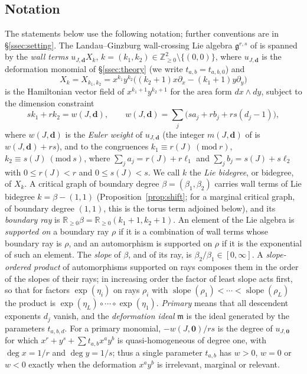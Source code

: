 \documentclass[11pt]{amsart}
\theoremstyle{definition}
\theoremstyle{remark}
\newcommand{\ZZ}{\mathbb{Z}}
\newcommand{\RR}{\mathbb{R}}
\newcommand{\gfrak}{\mathfrak{g}}
\begin{document}
\subsection*{Notation}
The statements below use the following notation; further conventions are in
\S\ref{ssec:setting}.  The Landau--Ginzburg wall-crossing Lie algebra
$\gfrak^{r,s}$ of \cite[Def.~4.23]{GKT} is spanned by the \emph{wall terms}
$u_{J,\mathbf d}X_{k}$, $k=(k_1,k_2)\in\ZZ^2_{\ge0}\setminus\{(0,0)\}$, where
$u_{J,\mathbf d}$ is the deformation monomial of \S\ref{ssec:theory} (we write
$t_{a,b}=t_{a,b,0}$) and
\[
X_{k}=X_{k_{1},k_{2}}=x^{k_{1}}y^{k_{2}}\bigl((k_{2}{+}1)x\partial_{x}-(k_{1}{+}1)
y\partial_{y}\bigr)
\]
is the Hamiltonian vector field of $x^{k_{1}+1}y^{k_{2}+1}$ for the area form
$dx\wedge dy$, subject to the dimension constraint
\begin{equation}
\label{eq:dimconstraint}
sk_{1}+rk_{2}=w(J,\mathbf d),
\qquad
w(J,\mathbf d)=\sum_{j}\bigl(sa_{j}+rb_{j}+rs(d_{j}-1)\bigr),
\end{equation}
where $w(J,\mathbf d)$ is the \emph{Euler weight} of $u_{J,\mathbf d}$ (the
integer $m(J,\mathbf d)$ of \cite[Not.~2.30]{GKT} is $w(J,\mathbf d)+rs$),
and to the congruences $k_1\equiv r(J)\ (\mathrm{mod}\ r)$,
$k_2\equiv s(J)\ (\mathrm{mod}\ s)$, where
$\sum_{j}a_j=r(J)+r\ell_1$ and $\sum_{j}b_j=s(J)+s\ell_2$ with
$0\le r(J)<r$ and $0\le s(J)<s$.  We call $k$ the \emph{Lie bidegree}, or
bidegree, of $X_k$.  A critical graph of boundary degree
$\beta=(\beta_1,\beta_2)$ carries wall terms of Lie bidegree $k=\beta-(1,1)$
(Proposition~\ref{prop:shift}; for a marginal critical graph, of boundary
degree $(1,1)$, this is the torus term adjoined below), and its
\emph{boundary ray} is $\RR_{\ge0}\beta=\RR_{\ge0}(k_1+1,k_2+1)$.  An element
of the Lie algebra is \emph{supported on} a boundary ray $\rho$ if it is a
combination of wall terms whose boundary ray is $\rho$, and an automorphism is
supported on $\rho$ if it is the exponential of such an element.  The \emph{slope} of $\beta$, and of
its ray, is $\beta_2/\beta_1\in[0,\infty]$.  A \emph{slope-ordered product} of
automorphisms supported on rays composes them in the order of the slopes of
their rays; in increasing order the factor of least slope acts first, so that
for factors $\exp(\eta_i)$ on rays $\rho_i$ with
$\operatorname{slope}(\rho_1)<\cdots<\operatorname{slope}(\rho_L)$ the product
is $\exp(\eta_L)\circ\cdots\circ\exp(\eta_1)$.  \emph{Primary} means that all
descendent exponents $d_j$ vanish, and the \emph{deformation ideal}
$\mathfrak m$ is the ideal generated by the parameters $t_{a,b,d}$.  For a
primary monomial, $-w(J,\mathbf 0)/rs$ is the degree of $u_{J,\mathbf 0}$
for which $x^r+y^s+\sum t_{a,b}x^ay^b$ is quasi-homogeneous of degree one,
with $\deg x=1/r$ and $\deg y=1/s$; thus a single parameter $t_{a,b}$ has
$w>0$, $w=0$ or $w<0$ exactly when the deformation $x^ay^b$ is irrelevant,
marginal or relevant.
\end{document}
